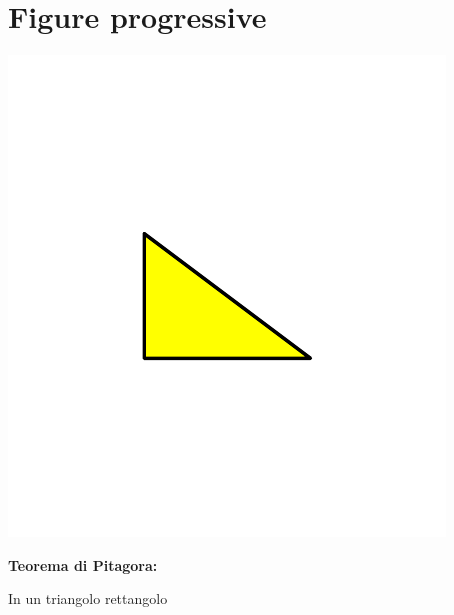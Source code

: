 \documentclass[12pt,italian,oneside]{report}
\begin{document}
\section{Figure progressive}

\begin{center}
\includegraphics[scale=1.2]{pitagora1}
\end{center}

\begin{firstheadlineitemize}

\item \textbf{Teorema di Pitagora:}

\pause

\begin{secondheadlineitemize}

\item In un triangolo rettangolo

\end{secondheadlineitemize}

\end{firstheadlineitemize}

\newframe
\end{document}
